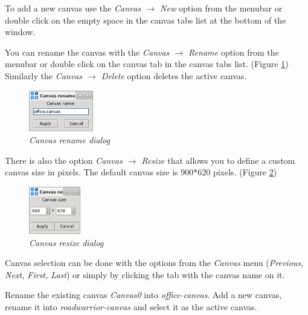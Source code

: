 To add a new canvas use the \emph{Canvas $\to$ New} option from the menubar or
double click on the empty space in the canvas tabs list at the bottom of the
window.

You can rename the canvas with the \emph{Canvas $\to$ Rename} option from the
menubar or double click on the canvas tab in the canvas tabs list. (Figure
\ref{fig:canvas_rename}) Similarly the \emph{Canvas $\to$ Delete} option
deletes the active canvas.
\begin{figure}[H]
    \centering
    \vspace{10pt}
    \includegraphics[width=0.25\textwidth]{./images/canvas_rename.png}
    \caption{\emph{Canvas rename dialog}}
    \label{fig:canvas_rename}
\end{figure}

There is also the option \emph{Canvas $\to$ Resize} that allows you to define a
custom canvas size in pixels. The default canvas size is 900*620 pixels.
(Figure \ref{fig:canvas_resize})
\begin{figure}[H]
    \centering
    \vspace{10pt}
    \includegraphics[width=0.20\textwidth]{./images/canvas_resize.png}
    \caption{\emph{Canvas resize dialog}}
    \label{fig:canvas_resize}
\end{figure}

Canvas selection can be done with the options from the \emph{Canvas} menu
(\emph{Previous, Next, First, Last}) or simply by clicking the tab with the
canvas name on it.

Rename the existing canvas \emph{Canvas0} into \emph{office-canvas}. Add a new
canvas, rename it into \emph{roadwarrior-canvas} and select it as the active
canvas. 

